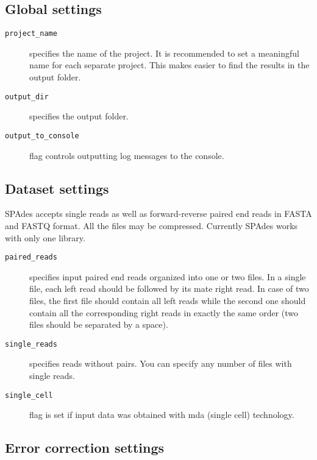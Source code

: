 \documentclass{article}
\def\spades{SPAdes}
\begin{document}
\subsection{Global settings}
\begin{description}
\item[{\tt project\_name}] specifies the name of the project. It is recommended to set a meaningful name for each separate project. This makes easier to find the results in the output folder.
\item[{\tt output\_dir}] specifies the output folder.
\item[{\tt output\_to\_console}] flag controls outputting log messages to the console.
\end{description}

\subsection{Dataset settings}
{\spades} accepts single reads as well as forward-reverse paired end reads
in FASTA and FASTQ format. All the files may be compressed. Currently {\spades} works with only one library.

\begin{description}
\item[{\tt paired\_reads}] specifies input paired end reads organized into one or two files.
In a single file, each left read should be followed by its mate right read. In case of two files, the first file should contain all left reads while the second one should contain all the corresponding right reads in exactly the same order (two files should be separated by a space).
\item[{\tt single\_reads}] specifies reads without pairs. You can specify any number of
files with single reads.
\item[{\tt single\_cell}] flag is set if input data was obtained with mda (single cell) technology.
\end{description}

\subsection{Error correction settings}
\end{document}
